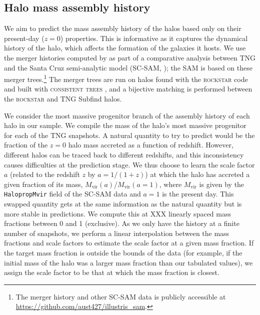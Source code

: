 \subsection{Halo mass assembly history}
\label{sec:mah}

We aim to predict the mass assembly history of the \dark halos based only on their present-day ($z=0$) properties.
This is informative as it captures the dynamical history of the halo, which affects the formation of the galaxies it hosts.
We use the merger histories computed by \citep{gabrielpillai_galaxy_2021} as part of a comparative analysis between TNG and the Santa Cruz semi-analytic model (SC-SAM, \citealt{somerville_semi-analytic_1999,somerville_semi-analytic_2008, somerville_star_2015}); the SAM is based on these merger trees.\footnote{The merger history and other SC-SAM data is publicly accessible at \url{https://github.com/aust427/illustris_sam}.}
The merger trees are run on halos found with the \textsc{rockstar} \citep{behroozi_rockstar_2013} code and built with \textsc{consistent trees} \citep{behroozi_gravitationally_2012}, and a bijective matching is performed between the \textsc{rockstar} and TNG Subfind halos.

We consider the most massive progenitor branch of the assembly history of each \dark halo in our sample.
We compile the mass of the halo's most massive progenitor for each of the TNG snapshots. 
A natural quantity to try to predict would be the fraction of the $z=0$ halo mass accreted as a function of redshift.
However, different halos can be traced back to different redshifts, and this inconsistency causes difficulties at the prediction stage.
We thus choose to learn the scale factor $a$ (related to the redshift $z$ by $a=1/(1+z)$) at which the halo has accreted a given fraction of its mass, $M_\mathrm{vir}(a)$/$M_\mathrm{vir}(a=1)$, where $M_\mathrm{vir}$ is given by the \texttt{HalopropMvir} field of the SC-SAM data and $a=1$ is the present day.
This swapped quantity gets at the same information as the natural quantity but is more stable in predictions.
We compute this at XXX linearly spaced mass fractions between 0 and 1 (exclusive). 
As we only have the history at a finite number of snapshots, we perform a linear interpolation between the mass fractions and scale factors to estimate the scale factor at a given mass fraction.
If the target mass fraction is outside the bounds of the data (for example, if the initial mass of the halo was a larger mass fraction than our tabulated values), we assign the scale factor to be that at which the mass fraction is closest.  



